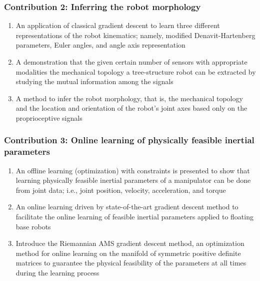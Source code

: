 \documentclass[12pt, a4paper]{article}
\begin{document}
\subsubsection*{Contribution 2: Inferring the robot morphology}
\begin{enumerate}
	\item An application of classical gradient descent to learn three different representations of the robot kinematics; namely, modified Denavit-Hartenberg parameters, Euler angles, and angle axis representation
	\item A demonstration that the given certain number of sensors with appropriate modalities the mechanical topology a tree-structure robot can be extracted by studying the mutual information among the signals
	\item A method to infer the robot morphology, that is, the mechanical topology and the location and orientation of the robot's joint axes based only on the proprioceptive signals

\end{enumerate}

\subsubsection*{Contribution 3: Online learning of physically feasible inertial parameters}
\begin{enumerate}
	\item An offline learning (optimization) with constraints is presented to show that learning physically feasible inertial parameters of a manipulator can be done from joint data; i.e., joint position, velocity, acceleration, and torque
	\item An online learning driven by state-of-the-art gradient descent method to facilitate the online learning of feasible inertial parameters applied to floating base robots 
	\item Introduce the Riemannian AMS gradient descent method, an optimization method for online learning on the manifold of symmetric positive definite matrices to guarantee the physical feasibility of the parameters at all times during the learning process
\end{enumerate}
\end{document}
